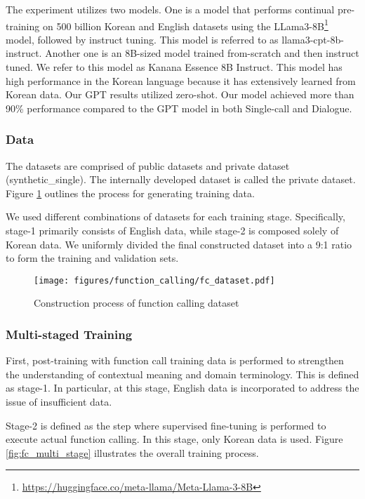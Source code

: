 \par
The experiment utilizes two models. One is a model that performs continual pre-training on 500 billion Korean and English datasets using the LLama3-8B\footnote{\url{https://huggingface.co/meta-llama/Meta-Llama-3-8B}} model, followed by instruct tuning. This model is referred to as llama3-cpt-8b-instruct. Another one is an 8B-sized model trained from-scratch and then instruct tuned. We refer to this model as Kanana Essence 8B Instruct. This model has high performance in the Korean language because it has extensively learned from Korean data. Our GPT results utilized zero-shot. Our model achieved more than 90\% performance compared to the GPT model in both Single-call and Dialogue.


\subsubsection{Data}
The datasets are comprised of public datasets \citep{rastogi2020towards, liu2024apigen} and private dataset (synthetic\_single). The internally developed dataset is called the private dataset.  Figure \ref{fig:fc_dataset} outlines the process for generating training data.\par
We used different combinations of datasets for each training stage. Specifically, stage-1 primarily consists of English data, while stage-2 is composed solely of Korean data. We uniformly divided the final constructed dataset into a 9:1 ratio to form the training and validation sets.
\begin{figure}[h]
    \centering
    \texttt{[image: figures/function\_calling/fc\_dataset.pdf]}
    \caption{Construction process of function calling dataset}
    \label{fig:fc_dataset}
\end{figure}

\subsubsection{Multi-staged Training}
First, post-training with function call training data is performed to strengthen the understanding of contextual meaning and domain terminology\citep{whang2019effective}. This is defined as stage-1. In particular, at this stage, English data is incorporated to address the issue of insufficient data.\par

Stage-2 is defined as the step where supervised fine-tuning is performed to execute actual function calling. In this stage, only Korean data is used. Figure \ref{fig:fc_multi_stage} illustrates the overall training process.\par

